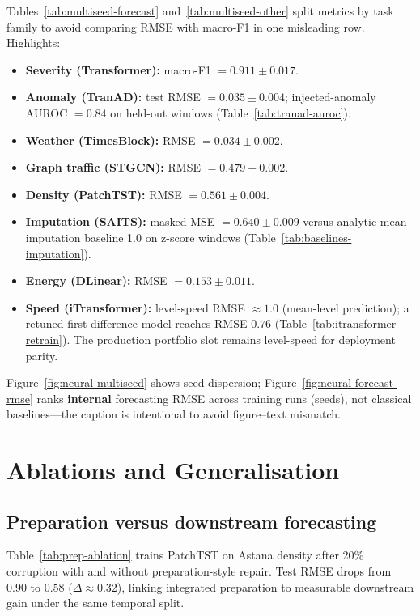 Tables~\ref{tab:multiseed-forecast} and~\ref{tab:multiseed-other} split metrics by task family to avoid comparing RMSE with macro-F1 in one misleading row. Highlights:
\begin{itemize}
  \item \textbf{Severity (Transformer):} macro-F1 $= 0.911 \pm 0.017$.
  \item \textbf{Anomaly (TranAD):} test RMSE $= 0.035 \pm 0.004$; injected-anomaly AUROC $= 0.84$ on held-out windows (Table~\ref{tab:tranad-auroc}).
  \item \textbf{Weather (TimesBlock):} RMSE $= 0.034 \pm 0.002$.
  \item \textbf{Graph traffic (STGCN):} RMSE $= 0.479 \pm 0.002$.
  \item \textbf{Density (PatchTST):} RMSE $= 0.561 \pm 0.004$.
  \item \textbf{Imputation (SAITS):} masked MSE $= 0.640 \pm 0.009$ versus analytic mean-imputation baseline 1.0 on z-score windows (Table~\ref{tab:baselines-imputation}).
  \item \textbf{Energy (DLinear):} RMSE $= 0.153 \pm 0.011$.
  \item \textbf{Speed (iTransformer):} level-speed RMSE $\approx 1.0$ (mean-level prediction); a retuned first-difference model reaches RMSE $0.76$ (Table~\ref{tab:itransformer-retrain}). The production portfolio slot remains level-speed for deployment parity.
\end{itemize}

Figure~\ref{fig:neural-multiseed} shows seed dispersion; Figure~\ref{fig:neural-forecast-rmse} ranks \textbf{internal} forecasting RMSE across training runs (seeds), not classical baselines---the caption is intentional to avoid figure--text mismatch.



\section{Ablations and Generalisation}
\label{sec:ablations}

\subsection{Preparation versus downstream forecasting}

Table~\ref{tab:prep-ablation} trains PatchTST on Astana density after 20\% corruption with and without preparation-style repair. Test RMSE drops from $0.90$ to $0.58$ ($\Delta \approx 0.32$), linking integrated preparation to measurable downstream gain under the same temporal split.

